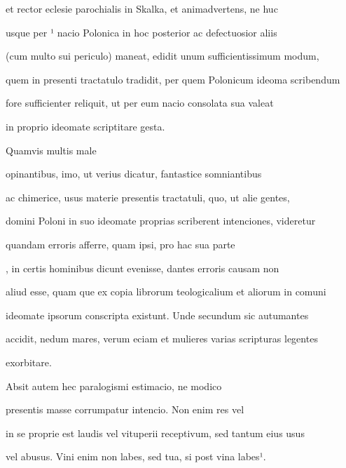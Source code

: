 et rector eclesie parochialis in Skalka, et animadvertens, ne huc

usque per ¹ nacio Polonica in hoc posterior ac defectuosior aliis

(cum multo sui periculo) maneat, edidit unum sufficientissimum modum,

quem in presenti tractatulo tradidit, per quem Polonicum ideoma scribendum

fore sufficienter reliquit, ut per eum nacio consolata sua valeat

\splitlines{}

in proprio ideomate scriptitare gesta.

\indentP Quamvis multis male

\fulllines{}

opinantibus, imo, ut verius dicatur, fantastice somniantibus

ac chimerice, usus materie presentis tractatuli, quo, ut alie gentes,

domini Poloni in suo ideomate proprias scriberent intenciones, videretur 

 quandam erroris afferre, quam ipsi, pro hac sua parte 

, in certis hominibus dicunt evenisse, dantes erroris causam non

aliud esse, quam que ex copia librorum teologicalium et aliorum in comuni

ideomate ipsorum conscripta existunt. Unde secundum sic autumantes

accidit, nedum mares, verum eciam et mulieres varias scripturas legentes

\splitlines{}

exorbitare.

\indentK Absit autem hec paralogismi estimacio, ne modico 

\fulllines{}

 presentis masse corrumpatur intencio. Non enim res vel 

 in se proprie est laudis vel vituperii receptivum, sed tantum eius usus

vel abusus. Vini enim non labes, sed tua, si post vina labes¹.

